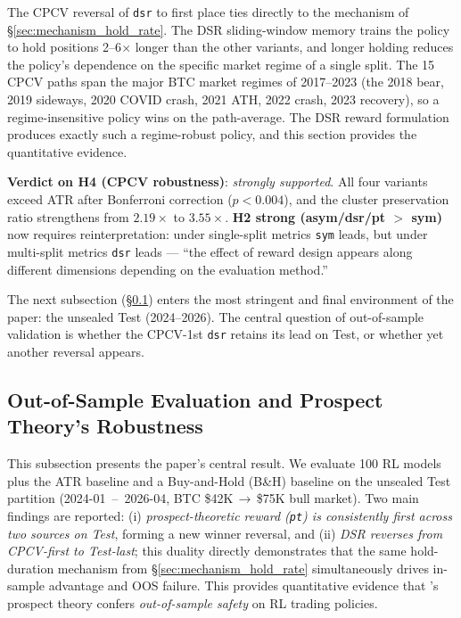 \documentclass[11pt, a4paper]{article}
\begin{document}
The CPCV reversal of \texttt{dsr} to first place ties directly to the
mechanism of \S\ref{sec:mechanism_hold_rate}. The DSR sliding-window memory
trains the policy to hold positions 2--6$\times$ longer than the other
variants, and longer holding reduces the policy's dependence on the specific
market regime of a single split. The 15 CPCV paths span the major BTC market
regimes of 2017--2023 (the 2018 bear, 2019 sideways, 2020 COVID crash, 2021
ATH, 2022 crash, 2023 recovery), so a regime-insensitive policy wins on the
path-average. The DSR reward formulation produces exactly such a regime-robust
policy, and this section provides the quantitative evidence.

\textbf{Verdict on H4 (CPCV robustness)}: \emph{strongly supported}. All four
variants exceed ATR after Bonferroni correction ($p < 0.004$), and the
cluster preservation ratio strengthens from $2.19\times$ to $3.55\times$.
\textbf{H2 strong (asym/dsr/pt $>$ sym)} now requires reinterpretation: under
single-split metrics \texttt{sym} leads, but under multi-split metrics
\texttt{dsr} leads --- ``the effect of reward design appears along different
dimensions depending on the evaluation method.''

The next subsection (\S\ref{sec:oos}) enters the most stringent and final
environment of the paper: the unsealed Test (2024--2026). The central question
of out-of-sample validation is whether the CPCV-1st \texttt{dsr} retains its
lead on Test, or whether yet another reversal appears.

\subsection{Out-of-Sample Evaluation and Prospect Theory's Robustness}
\label{sec:oos}

This subsection presents the paper's central result. We evaluate 100 RL models
plus the ATR baseline and a Buy-and-Hold (B\&H) baseline on the unsealed
Test partition (2024-01 \,--\, 2026-04, BTC \$42K\,$\to$\,\$75K bull market).
Two main findings are reported: (i) \emph{prospect-theoretic reward
(\texttt{pt}) is consistently first across two sources on Test}, forming a
new winner reversal, and (ii) \emph{DSR reverses from CPCV-first to
Test-last}; this duality directly demonstrates that the same hold-duration
mechanism from \S\ref{sec:mechanism_hold_rate} simultaneously drives in-sample
advantage and OOS failure. This provides quantitative evidence that
\citet{kahneman1979prospect}'s prospect theory confers \emph{out-of-sample
safety} on RL trading policies.
\end{document}
